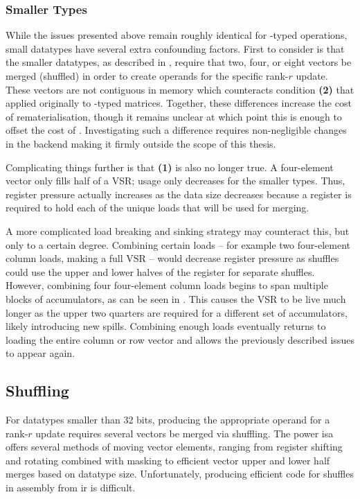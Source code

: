 \documentclass[\main/thesis.tex]{subfiles}
\begin{document}
\subsubsection{Smaller Types}
While the issues presented above remain roughly identical for -typed operations, small datatypes have several extra confounding factors.
First to consider is that the smaller datatypes, as described in , require that two, four, or eight vectors be merged (shuffled) in order to create operands for the specific rank-$r$ update.
These vectors are not contiguous in memory which counteracts condition \textbf{(2)} that applied originally to -typed matrices.
Together, these differences increase the cost of \gls{rematerialisation}, though it remains unclear at which point this is enough to offset the cost of .
Investigating such a difference requires non-negligible changes in the backend making it firmly outside the scope of this thesis.

Complicating things further is that \textbf{(1)} is also no longer true.
A four-element  vector only fills half of a VSR; usage only decreases for the smaller types.
Thus, register pressure actually increases as the data size decreases because a register is required to hold each of the unique loads that will be used for merging.

A more complicated load breaking and sinking strategy may counteract this, but only to a certain degree.
Combining certain loads -- for example two four-element  column loads, making a full VSR -- would decrease register pressure as shuffles could use the upper and lower halves of the register for separate shuffles.
However, combining four four-element  column loads begins to span multiple blocks of accumulators, as can be seen in .
This causes the VSR to be \gls{live} much longer as the upper two quarters are required for a different set of accumulators, likely introducing new spills.
Combining enough loads eventually returns to loading the entire column or row vector and allows the previously described issues to appear again.

\subsection{Shuffling}
For datatypes smaller than 32 bits, producing the appropriate operand for a rank-$r$ update requires several vectors be merged via shuffling.
The \gls{power} \gls{isa} offers several methods of moving vector elements, ranging from register shifting and rotating combined with masking to efficient vector upper and lower half merges based on datatype size.
Unfortunately, producing efficient code for shuffles in assembly from \gls{ir} is difficult.
\end{document}
